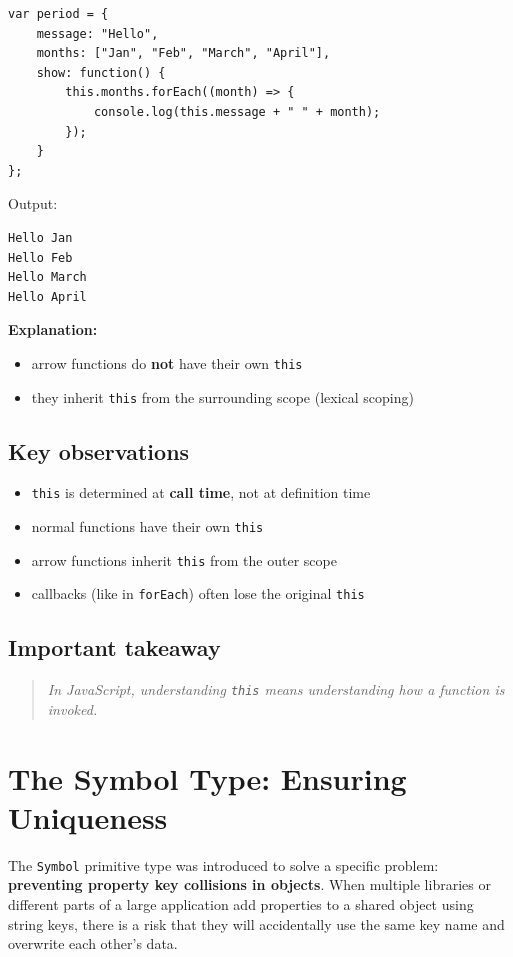 \documentclass{scrbook}
\begin{document}
\begin{lstlisting}
var period = {
    message: "Hello",
    months: ["Jan", "Feb", "March", "April"],
    show: function() {
        this.months.forEach((month) => {
            console.log(this.message + " " + month);
        });
    }
};
\end{lstlisting}

Output:
\begin{lstlisting}
Hello Jan
Hello Feb
Hello March
Hello April
\end{lstlisting}

\textbf{Explanation:}
\begin{itemize}
    \item arrow functions do \textbf{not} have their own \texttt{this}
    \item they inherit \texttt{this} from the surrounding scope (lexical scoping)
\end{itemize}

\subsection{Key observations}

\begin{itemize}
    \item \texttt{this} is determined at \textbf{call time}, not at definition time
    \item normal functions have their own \texttt{this}
    \item arrow functions inherit \texttt{this} from the outer scope
    \item callbacks (like in \texttt{forEach}) often lose the original \texttt{this}
\end{itemize}

\subsection{Important takeaway}

\begin{quote}
\textit{In JavaScript, understanding \texttt{this} means understanding how a function is invoked.}
\end{quote}

\section{The Symbol Type: Ensuring Uniqueness}

The \texttt{Symbol} primitive type was introduced to solve a specific problem: \textbf{preventing property key collisions in objects}. When multiple libraries or different parts of a large application add properties to a shared object using string keys, there is a risk that they will accidentally use the same key name and overwrite each other's data. \\
\end{document}
